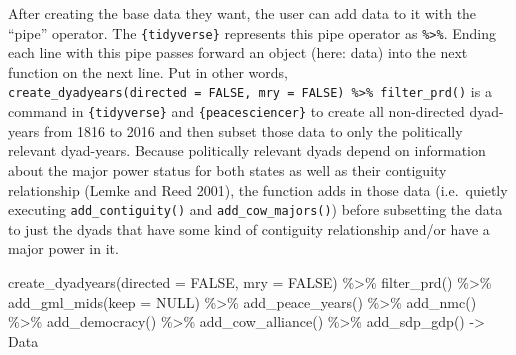 \documentclass[
  11pt,
]{article}
\newenvironment{Shaded}{\begin{snugshade}}{\end{snugshade}}
\newcommand{\AttributeTok}[1]{\textcolor[rgb]{0.77,0.63,0.00}{#1}}
\newcommand{\ConstantTok}[1]{\textcolor[rgb]{0.00,0.00,0.00}{#1}}
\newcommand{\FunctionTok}[1]{\textcolor[rgb]{0.00,0.00,0.00}{#1}}
\newcommand{\NormalTok}[1]{#1}
\newcommand{\OtherTok}[1]{\textcolor[rgb]{0.56,0.35,0.01}{#1}}
\newcommand{\SpecialCharTok}[1]{\textcolor[rgb]{0.00,0.00,0.00}{#1}}
\begin{document}
After creating the base data they want, the user can add data to it with the ``pipe'' operator. The \texttt{\{tidyverse\}} represents this pipe operator as \texttt{\%\textgreater{}\%}. Ending each line with this pipe passes forward an object (here: data) into the next function on the next line. Put in other words, \texttt{create\_dyadyears(directed\ =\ FALSE,\ mry\ =\ FALSE)\ \%\textgreater{}\%\ filter\_prd()} is a command in \texttt{\{tidyverse\}} and \texttt{\{peacesciencer\}} to create all non-directed dyad-years from 1816 to 2016 and then subset those data to only the politically relevant dyad-years. Because politically relevant dyads depend on information about the major power status for both states as well as their contiguity relationship (Lemke and Reed 2001), the function adds in those data (i.e.~quietly executing \texttt{add\_contiguity()} and \texttt{add\_cow\_majors()}) before subsetting the data to just the dyads that have some kind of contiguity relationship and/or have a major power in it.

\begin{Shaded}
\begin{Highlighting}[]
\FunctionTok{create\_dyadyears}\NormalTok{(}\AttributeTok{directed =} \ConstantTok{FALSE}\NormalTok{, }\AttributeTok{mry =} \ConstantTok{FALSE}\NormalTok{) }\SpecialCharTok{\%\textgreater{}\%}
  \FunctionTok{filter\_prd}\NormalTok{() }\SpecialCharTok{\%\textgreater{}\%}
  \FunctionTok{add\_gml\_mids}\NormalTok{(}\AttributeTok{keep =} \ConstantTok{NULL}\NormalTok{) }\SpecialCharTok{\%\textgreater{}\%}
  \FunctionTok{add\_peace\_years}\NormalTok{() }\SpecialCharTok{\%\textgreater{}\%}
  \FunctionTok{add\_nmc}\NormalTok{() }\SpecialCharTok{\%\textgreater{}\%}
  \FunctionTok{add\_democracy}\NormalTok{() }\SpecialCharTok{\%\textgreater{}\%}
  \FunctionTok{add\_cow\_alliance}\NormalTok{() }\SpecialCharTok{\%\textgreater{}\%}
  \FunctionTok{add\_sdp\_gdp}\NormalTok{() }\OtherTok{{-}\textgreater{}}\NormalTok{ Data}
\end{Highlighting}
\end{Shaded}
\end{document}
